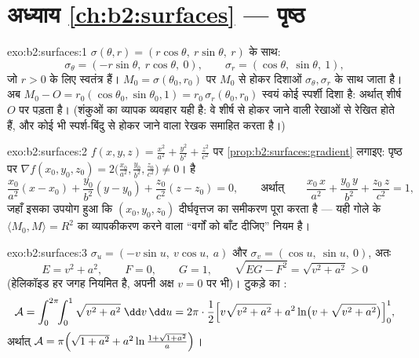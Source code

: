 \section*{अध्याय \ref{ch:b2:surfaces} --- पृष्ठ}

\begin{solution}{exo:b2:surfaces:1}
$\sigma(\theta, r) = (r\cos\theta,\ r\sin\theta,\ r)$ के साथ:
\[
\sigma_\theta = (-r\sin\theta,\ r\cos\theta,\ 0),
\qquad
\sigma_r = (\cos\theta,\ \sin\theta,\ 1),
\]
जो $r > 0$ के लिए स्वतंत्र हैं। $M_0 =
\sigma(\theta_0, r_0)$ पर  $M_0$ से होकर
दिशाओं $\sigma_\theta, \sigma_r$ के साथ जाता है। अब $M_0 - O = r_0(\cos\theta_0,
\sin\theta_0, 1) = r_0\,\sigma_r(\theta_0, r_0)$ स्वयं कोई स्पर्शी दिशा
है: अर्थात् शीर्ष $O$  पर पड़ता है। (शंकुओं का व्यापक
व्यवहार यही है: वे शीर्ष से होकर जाने वाली रेखाओं से रेखित होते हैं,
और कोई भी  स्पर्श-बिंदु से होकर जाने वाला रेखक समाहित करता है।)
\end{solution}

\begin{solution}{exo:b2:surfaces:2}
$f(x,y,z) =
\frac{x^2}{a^2} + \frac{y^2}{b^2} + \frac{z^2}{c^2}$ पर \cref{prop:b2:surfaces:gradient} लगाइए: पृष्ठ पर $\nabla
f(x_0,y_0,z_0) = 2\bigl(\frac{x_0}{a^2}, \frac{y_0}{b^2},
\frac{z_0}{c^2}\bigr) \neq 0$।  है
\[
\frac{x_0}{a^2}(x - x_0) + \frac{y_0}{b^2}(y - y_0)
+ \frac{z_0}{c^2}(z - z_0) = 0,
\qquad\text{अर्थात्}\qquad
\frac{x_0\,x}{a^2} + \frac{y_0\,y}{b^2} + \frac{z_0\,z}{c^2} = 1,
\]
जहाँ इसका उपयोग हुआ कि $(x_0, y_0, z_0)$ दीर्घवृत्तज का समीकरण पूरा करता है ---
यही गोले के $\langle
M_0, M \rangle = R^2$ का व्यापकीकरण करने वाला ``वर्गों को बाँट दीजिए''
नियम है।
\end{solution}

\begin{solution}{exo:b2:surfaces:3}
$\sigma_u = (-v\sin u,\ v\cos u,\ a)$ और $\sigma_v = (\cos u,\
\sin u,\ 0)$, अतः
\[
E = v^2 + a^2, \qquad F = 0, \qquad G = 1,
\qquad
\sqrt{EG - F^2} = \sqrt{v^2 + a^2} > 0
\]
(हेलिकॉइड हर जगह नियमित है, अपनी अक्ष $v =
0$ पर भी)। टुकड़े का
:
\[
\mathcal{A} = \int_0^{2\pi}\!\!\int_0^1
\sqrt{v^2 + a^2}\;\dd v\,\dd u
= 2\pi\cdot\frac12\Bigl[v\sqrt{v^2 + a^2}
+ a^2\ln\bigl(v + \sqrt{v^2 + a^2}\bigr)\Bigr]_0^1 ,
\]
अर्थात् $\mathcal{A} = \pi\Bigl(\sqrt{1 + a^2} +
a^2\ln\frac{1 + \sqrt{1 + a^2}}{a}\Bigr)$।
\end{solution}

